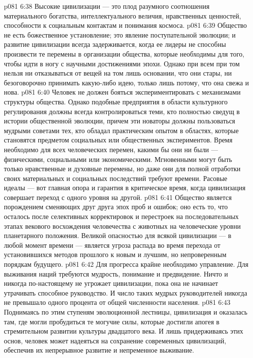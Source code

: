 \vs p081 6:38 Высокие цивилизации --- это плод разумного соотношения материального богатства, интеллектуального величия, нравственных ценностей, способности к социальным контактам и понимания космоса.
\vs p081 6:39 \bibnobreakspace {} Общество не есть божественное установление; это явление поступательной эволюции; и развитие цивилизации всегда задерживается, когда ее лидеры не способны произвести те перемены в организации общества, которые необходимы для того, чтобы идти в ногу с научными достижениями эпохи. Однако при всем при том нельзя ни отказываться от вещей на том лишь основании, что они стары, ни безоговорочно принимать какую\hyp{}либо идею, только лишь потому, что она свежа и нова.
\vs p081 6:40 Человек не должен бояться экспериментировать с механизмами структуры общества. Однако подобные предприятия в области культурного регулирования должны всегда контролироваться теми, кто полностью сведущ в истории общественной эволюции, причем эти новаторы должны пользоваться мудрыми советами тех, кто обладал практическим опытом в областях, которые становятся предметом социальных или общественных экспериментов.  Время необходимо для всех человеческих перемен, какими бы они ни были --- физическими, социальными или экономическими. Мгновенными могут быть только нравственные и духовные перемены, но даже они для полной отработки своих материальных и социальных последствий требуют времени. Расовые идеалы --- вот главная опора и гарантия в критическое время, когда цивилизация совершает переход с одного уровня на другой.
\vs p081 6:41 \bibnobreakspace {} Общество является порождением сменяющих друг друга эпох проб и ошибок; оно есть то, что осталось после селективных корректировок и перестроек на последовательных этапах векового восхождения человечества с животных на человеческие уровни планетарного положения. Великой опасностью для всякой цивилизации --- в любой момент времени --- является угроза распада во время перехода от установившихся методов прошлого к новым и лучшим, но непроверенным порядкам будущего.
\vs p081 6:42 Для прогресса крайне необходимо управление. Для выживания наций требуются мудрость, понимание и предвидение. Ничто и никогда по\hyp{}настоящему не угрожает цивилизации, пока она не начинает утрачивать способное руководство. И число таких мудрых руководителей никогда не превышало одного процента от общей численности населения.
\vs p081 6:43 Поднимаясь по этим ступеням эволюционной лестницы, цивилизация и оказалась там, где могли пробудиться те могучие силы, которые достигли апогея в стремительном развитии культуры двадцатого века. И лишь придерживаясь этих основ, человек может надеяться на сохранение современных цивилизаций, обеспечив их непрерывное развитие и непременное выживание.
